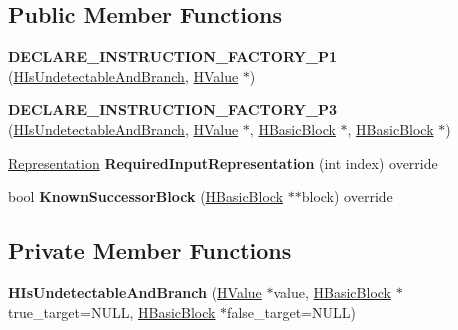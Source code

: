 \subsection*{Public Member Functions}
\begin{DoxyCompactItemize}
\item 
{\bfseries D\+E\+C\+L\+A\+R\+E\+\_\+\+I\+N\+S\+T\+R\+U\+C\+T\+I\+O\+N\+\_\+\+F\+A\+C\+T\+O\+R\+Y\+\_\+\+P1} (\hyperlink{classv8_1_1internal_1_1_h_is_undetectable_and_branch}{H\+Is\+Undetectable\+And\+Branch}, \hyperlink{classv8_1_1internal_1_1_h_value}{H\+Value} $\ast$)\hypertarget{classv8_1_1internal_1_1_h_is_undetectable_and_branch_af3a99d907132e77f6cc9afc08eee791a}{}\label{classv8_1_1internal_1_1_h_is_undetectable_and_branch_af3a99d907132e77f6cc9afc08eee791a}

\item 
{\bfseries D\+E\+C\+L\+A\+R\+E\+\_\+\+I\+N\+S\+T\+R\+U\+C\+T\+I\+O\+N\+\_\+\+F\+A\+C\+T\+O\+R\+Y\+\_\+\+P3} (\hyperlink{classv8_1_1internal_1_1_h_is_undetectable_and_branch}{H\+Is\+Undetectable\+And\+Branch}, \hyperlink{classv8_1_1internal_1_1_h_value}{H\+Value} $\ast$, \hyperlink{classv8_1_1internal_1_1_h_basic_block}{H\+Basic\+Block} $\ast$, \hyperlink{classv8_1_1internal_1_1_h_basic_block}{H\+Basic\+Block} $\ast$)\hypertarget{classv8_1_1internal_1_1_h_is_undetectable_and_branch_a0e245e88efde469fa9f0b188896ed632}{}\label{classv8_1_1internal_1_1_h_is_undetectable_and_branch_a0e245e88efde469fa9f0b188896ed632}

\item 
\hyperlink{classv8_1_1internal_1_1_representation}{Representation} {\bfseries Required\+Input\+Representation} (int index) override\hypertarget{classv8_1_1internal_1_1_h_is_undetectable_and_branch_aa053bf6abd6d4b4ae4b6ea51a4ac2897}{}\label{classv8_1_1internal_1_1_h_is_undetectable_and_branch_aa053bf6abd6d4b4ae4b6ea51a4ac2897}

\item 
bool {\bfseries Known\+Successor\+Block} (\hyperlink{classv8_1_1internal_1_1_h_basic_block}{H\+Basic\+Block} $\ast$$\ast$block) override\hypertarget{classv8_1_1internal_1_1_h_is_undetectable_and_branch_a7f4466351e9d695bcd6af3e46f717255}{}\label{classv8_1_1internal_1_1_h_is_undetectable_and_branch_a7f4466351e9d695bcd6af3e46f717255}

\end{DoxyCompactItemize}
\subsection*{Private Member Functions}
\begin{DoxyCompactItemize}
\item 
{\bfseries H\+Is\+Undetectable\+And\+Branch} (\hyperlink{classv8_1_1internal_1_1_h_value}{H\+Value} $\ast$value, \hyperlink{classv8_1_1internal_1_1_h_basic_block}{H\+Basic\+Block} $\ast$true\+\_\+target=N\+U\+LL, \hyperlink{classv8_1_1internal_1_1_h_basic_block}{H\+Basic\+Block} $\ast$false\+\_\+target=N\+U\+LL)\hypertarget{classv8_1_1internal_1_1_h_is_undetectable_and_branch_aae4832e99008bec6981562ae5be9c5cd}{}\label{classv8_1_1internal_1_1_h_is_undetectable_and_branch_aae4832e99008bec6981562ae5be9c5cd}

\end{DoxyCompactItemize}
